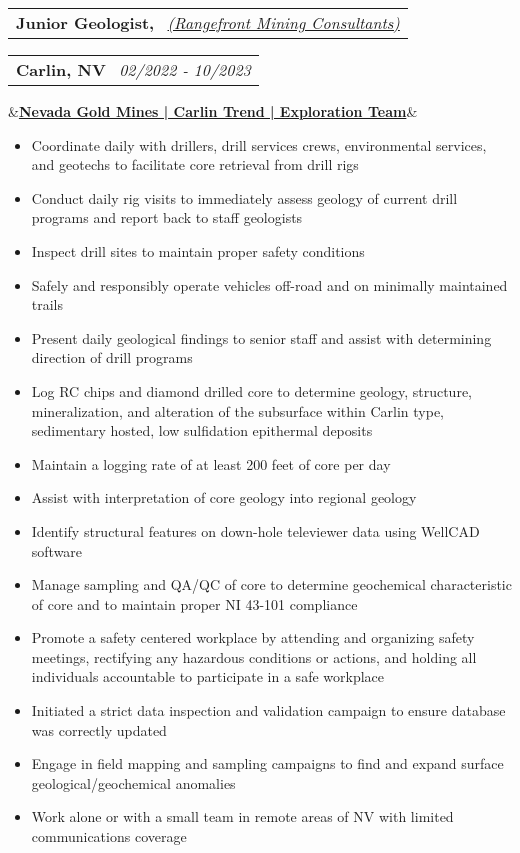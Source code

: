 \documentclass[12pt,a4paper,sans]{moderncv}
\makeatletter
\newcommand*{\customcventry}[7][.13em]{
\begin{tabular}{@{}l}
{\bfseries #4} \
{\itshape #3}
\end{tabular}
\hfill
\begin{tabular}{l@{}}
{\bfseries #5} \
{\itshape #2}
\end{tabular}
\ifx&#7&%
\else{\
\begin{minipage}{\maincolumnwidth}%
\small#7%
\end{minipage}}\fi%
\par\addvspace{#1}}
\makeatother
\begin{document}
\clearpage

\customcventry{02/2022 ‐ 10/2023}{{\color{blue}\href{https://www.rangefront.com/}{(Rangefront Mining Consultants)}}}{Junior Geologist,}{Carlin, NV}{}{\color{blue}\href{https://www.barrick.com/English/operations/nevada-gold-mines/default.aspx}{\color{blue}\textbf{Nevada Gold Mines | Carlin Trend | Exploration Team}}}
\vspace{-1mm}
{\begin{itemize}[noitemsep, leftmargin=0.6cm, label={\textbullet}]
\item Coordinate daily with drillers, drill services crews, environmental services, and geotechs to facilitate core retrieval from drill rigs
\item Conduct daily rig visits to immediately assess geology of current drill programs and report back to staff geologists
\item Inspect drill sites to maintain proper safety conditions 
\item Safely and responsibly operate vehicles off-road and on minimally maintained trails 
\item Present daily geological findings to senior staff and assist with determining direction of drill programs 
\item Log RC chips and diamond drilled core to determine geology, structure, mineralization, and alteration of the subsurface within Carlin type, sedimentary hosted, low sulfidation epithermal deposits 
\item Maintain a logging rate of at least 200 feet of core per day
\item Assist with interpretation of core geology into regional geology 
\item Identify structural features on down-hole televiewer data using WellCAD software 
\item Manage sampling and QA/QC of core to determine geochemical characteristic of core and to maintain proper NI 43-101 compliance
\item Promote a safety centered workplace by attending and organizing safety meetings, rectifying any hazardous conditions or actions, and holding all individuals accountable to participate in a safe workplace
\item Initiated a strict data inspection and validation campaign to ensure database was correctly updated
\item Engage in field mapping and sampling campaigns to find and expand surface geological/geochemical anomalies
\item Work alone or with a small team in remote areas of NV with limited communications coverage
\end{itemize}}
\end{document}
